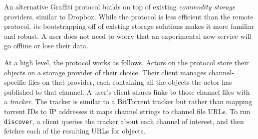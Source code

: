 An alternative Graffiti protocol builds on top of existing
\emph{commodity storage} providers,
similar to Dropbox.
While the protocol is less efficient than the remote
protocol, its bootstrapping off of existing
storage solutions makes it more familiar and robust.
A user does not need to worry that an experimental new service
will go offline or lose their data.

At a high level, the protocol works as follows.
Actors on the protocol store their objects on a storage
provider of their choice.
Their client manages channel-specific files on that provider,
each containing all the objects the actor has published to that channel.
A user's client shares links to those channel files
with a \emph{tracker}.
The tracker is similar to a BitTorrent tracker but
rather than mapping torrent IDs to IP addresses
it maps channel strings to channel file URLs.
To run \texttt{discover}, a client queries the tracker
about each channel of interest,
and then fetches each of the resulting URLs for objects.



